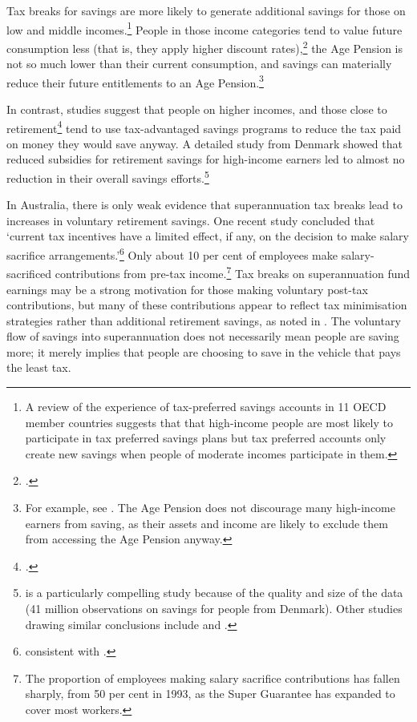 Tax breaks for savings are more likely to generate additional savings for those on low and middle incomes.\footnote{\textcite{OECD2007EncourageSavingsThroughTaxPreferredAccounts} A review of the experience of tax-preferred savings accounts in 11 OECD member countries suggests that that high-income people are most likely to participate in tax preferred savings plans but tax preferred accounts only create new savings when people of moderate incomes participate in them.}
People in those income categories tend to value future consumption less (that is, they apply higher discount rates),\footcite{DynanSkinnerZeldes2004} the Age Pension is not so much lower than their current consumption, and savings can materially reduce their future entitlements to an Age Pension.\footnote{For example, see \textcite{BlundellEmmersonWafefield2006}. The Age Pension does not discourage many high-income earners from saving, as their assets and income are likely to exclude them from accessing the Age Pension anyway.} 

In contrast, studies suggest that people on higher incomes, and those close to retirement\footcite{AyusoJimenoVillanueva2007} tend to use tax-advantaged savings programs to reduce the tax paid on money they would save anyway. A detailed study from Denmark showed that reduced subsidies for retirement savings for high-income earners led to almost no reduction in their overall savings efforts.\footnote{\textcite{ChettyFriedmanLethPetersenEtAl2014} is a particularly compelling study because of the quality and size of the data (41 million observations on savings for people from Denmark). Other studies drawing similar conclusions include \textcite{EngenGale2000} and \textcite{Benjamin2003}.}

In Australia, there is only weak evidence that superannuation tax breaks lead to increases in voluntary retirement savings. One recent study concluded that ‘current tax incentives have a limited effect, if any, on the decision to make salary sacrifice arrangements.’\footnote{\textcite{Feng2014} consistent with .}
Only about 10 per cent of employees make salary-sacrificed contributions from pre-tax income.\footnote{\textcite{ABS2013t} The proportion of employees making salary sacrifice contributions has fallen sharply, from 50 per cent in 1993, as the Super Guarantee has expanded to cover most workers.}
Tax breaks on superannuation fund earnings may be a strong motivation for those making voluntary post-tax contributions, but many of these contributions appear to reflect tax minimisation strategies rather than additional retirement savings, as noted in . The voluntary flow of savings into superannuation does not necessarily mean people are saving more; it merely implies that people are choosing to save in the vehicle that pays the least tax. 


